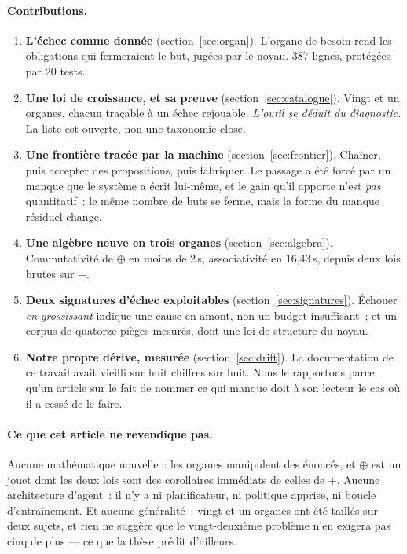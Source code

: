 \documentclass[11pt]{article}
\theoremstyle{remark}\newtheorem{remarque}{Remarque}
\begin{document}
\paragraph{Contributions.}
\begin{enumerate}\itemsep2pt
\item \textbf{L'échec comme donnée} (section~\ref{sec:organ}). L'organe de besoin rend
les obligations qui fermeraient le but, jugées par le noyau. 387 lignes, protégées par
20 tests.
\item \textbf{Une loi de croissance, et sa preuve} (section~\ref{sec:catalogue}). Vingt
et un organes, chacun traçable à un échec rejouable. \emph{L'outil se déduit du
diagnostic.} La liste est ouverte, non une taxonomie close.
\item \textbf{Une frontière tracée par la machine} (section~\ref{sec:frontier}).
Chaîner, puis accepter des propositions, puis fabriquer. Le passage a été forcé par un
manque que le système a écrit lui-même, et le gain qu'il apporte n'est \emph{pas}
quantitatif~: le même nombre de buts se ferme, mais la forme du manque résiduel change.
\item \textbf{Une algèbre neuve en trois organes} (section~\ref{sec:algebra}).
Commutativité de $\oplus$ en moins de 2\,s, associativité en 16,43\,s, depuis deux lois
brutes sur $+$.
\item \textbf{Deux signatures d'échec exploitables} (section~\ref{sec:signatures}).
Échouer \emph{en grossissant} indique une cause en amont, non un budget insuffisant~; et
un corpus de quatorze pièges mesurés, dont une loi de structure du noyau.
\item \textbf{Notre propre dérive, mesurée} (section~\ref{sec:drift}). La documentation
de ce travail avait vieilli sur huit chiffres sur huit. Nous le rapportons parce qu'un
article sur le fait de nommer ce qui manque doit à son lecteur le cas où il a cessé de
le faire.
\end{enumerate}

\paragraph{Ce que cet article ne revendique pas.} Aucune mathématique nouvelle~: les
organes manipulent des énoncés, et $\oplus$ est un jouet dont les deux lois sont des
corollaires immédiats de celles de $+$. Aucune architecture d'agent~: il n'y a ni
planificateur, ni politique apprise, ni boucle d'entraînement. Et aucune généralité~:
vingt et un organes ont été taillés sur deux sujets, et rien ne suggère que le
vingt-deuxième problème n'en exigera pas cinq de plus --- ce que la thèse prédit
d'ailleurs.
\end{document}

